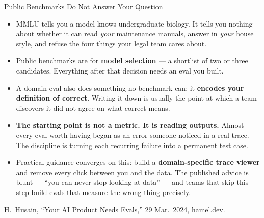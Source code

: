 \begin{frame}[allowframebreaks]{Public Benchmarks Do Not Answer Your Question}
  \begin{itemize}\itemsep0.35em
    \item[\textcolor{red}{$\blacktriangleright$}] MMLU tells you a model knows undergraduate biology. It tells you nothing about whether it can read \textit{your} maintenance manuals, answer in \textit{your} house style, and refuse the four things your legal team cares about.
    \item[\textcolor{red}{$\blacktriangleright$}] Public benchmarks are for \textbf{model selection} --- a shortlist of two or three candidates. Everything after that decision needs an eval you built.
    \item[\textcolor{red}{$\blacktriangleright$}] A domain eval also does something no benchmark can: it \textbf{encodes your definition of correct}. Writing it down is usually the point at which a team discovers it did not agree on what correct means.
    \item[\textcolor{red}{$\blacktriangleright$}] \textbf{The starting point is not a metric. It is reading outputs.} Almost every eval worth having began as an error someone noticed in a real trace. The discipline is turning each recurring failure into a permanent test case.
    \item[\textcolor{red}{$\blacktriangleright$}] Practical guidance converges on this: build a \textbf{domain-specific trace viewer} and remove every click between you and the data. The published advice is blunt --- ``you can never stop looking at data'' --- and teams that skip this step build evals that measure the wrong thing precisely.
  \end{itemize}
  \vspace{0.15em}
  {\scriptsize H.~Husain, ``Your AI Product Needs Evals,'' 29 Mar.\ 2024, \href{https://hamel.dev/blog/posts/evals/}{hamel.dev}.}
\end{frame}

